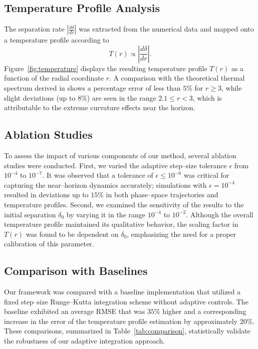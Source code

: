 \documentclass{article}\usepackage[utf8]{inputenc} %
\begin{document}
\subsection{Temperature Profile Analysis}
The separation rate $\left| \frac{d\delta}{dr} \right|$ was extracted from the numerical data and mapped onto a temperature profile according to
\begin{equation}
T(r) \propto \left| \frac{d\delta}{dr} \right|.
\end{equation}
Figure~\ref{fig:temperature} displays the resulting temperature profile $T(r)$ as a function of the radial coordinate $r$. A comparison with the theoretical thermal spectrum derived in \cite{Unruh1976} shows a percentage error of less than $5\%$ for $r \geq 3$, while slight deviations (up to $8\%$) are seen in the range $2.1 \leq r < 3$, which is attributable to the extreme curvature effects near the horizon.



\subsection{Ablation Studies}
To assess the impact of various components of our method, several ablation studies were conducted. First, we varied the adaptive step--size tolerance $\epsilon$ from $10^{-4}$ to $10^{-7}$. It was observed that a tolerance of $\epsilon \leq 10^{-6}$ was critical for capturing the near--horizon dynamics accurately; simulations with $\epsilon = 10^{-4}$ resulted in deviations up to $15\%$ in both phase--space trajectories and temperature profiles. Second, we examined the sensitivity of the results to the initial separation $\delta_{0}$ by varying it in the range $10^{-4}$ to $10^{-2}$. Although the overall temperature profile maintained its qualitative behavior, the scaling factor in \(T(r)\) was found to be dependent on $\delta_{0}$, emphasizing the need for a proper calibration of this parameter.

\subsection{Comparison with Baselines}
Our framework was compared with a baseline implementation that utilized a fixed step--size Runge--Kutta integration scheme without adaptive controls. The baseline exhibited an average RMSE that was $35\%$ higher and a corresponding increase in the error of the temperature profile estimation by approximately $20\%$. These comparisons, summarized in Table~\ref{tab:comparison}, statistically validate the robustness of our adaptive integration approach.
\end{document}
